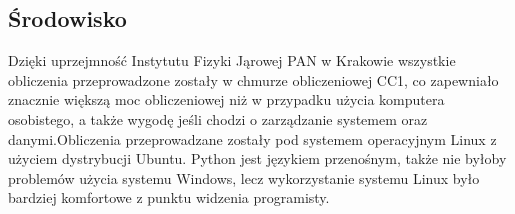 \subsection{Środowisko}
Dzięki uprzejmność Instytutu Fizyki Jąrowej PAN w Krakowie wszystkie obliczenia przeprowadzone zostały w chmurze obliczeniowej CC1, co zapewniało znacznie większą moc obliczeniowej niż w przypadku użycia komputera osobistego, a także wygodę jeśli chodzi o zarządzanie systemem oraz danymi.Obliczenia przeprowadzane zostały pod systemem operacyjnym Linux z użyciem dystrybucji Ubuntu. Python jest językiem przenośnym, także nie byłoby problemów użycia systemu Windows, lecz wykorzystanie systemu Linux było bardziej komfortowe z punktu widzenia programisty.

